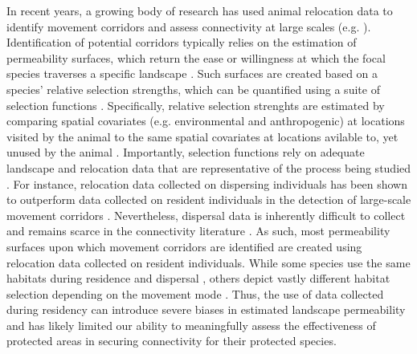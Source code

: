 \documentclass[abstract=on,10pt,a4paper,bibliography=totocnumbered]{article}
\begin{document}
In recent years, a growing body of research has used animal relocation data to
identify movement corridors and assess connectivity at large scales (e.g.
\citealp{Chetkiewicz.2006, Squires.2013, Elliot.2014}). Identification of
potential corridors typically relies on the estimation of permeability surfaces,
which return the ease or willingness at which the focal species traverses a
specific landscape \citep{Sawyer.2011}. Such surfaces are created based on a
species' relative selection strengths, which can be quantified
using a suite of selection functions \citep{Zeller.2012}. Specifically, relative
selection strenghts  are estimated by comparing spatial
covariates (e.g. environmental and anthropogenic) at locations visited by the
animal to the same spatial covariates at locations avilable to, yet unused by
 the animal
\citep{Zeller.2012}. Importantly, selection functions rely on adequate landscape
and relocation data that are representative of the process being studied
\citep{Diniz.2020}. For instance, relocation data collected on dispersing
individuals has been shown to outperform data collected on resident individuals
in the detection of large-scale movement corridors \citep{Elliot.2014,
Diniz.2020}. Nevertheless, dispersal data is inherently difficult to collect and
remains scarce in the connectivity literature \citep{Vasudev.2015}. As such,
most permeability surfaces upon which movement corridors are identified are
created using relocation data collected on resident individuals. While some
species use the same habitats during residence and dispersal
\citep{Fattebert.2015}, others depict vastly different habitat selection
depending on the movement mode \citep{Elliot.2014, Abrahms.2017}. Thus, the use
of data collected during residency can introduce severe biases in estimated
landscape permeability and has likely limited our ability to meaningfully assess
the effectiveness of protected areas in securing connectivity for their
protected species.
\end{document}
